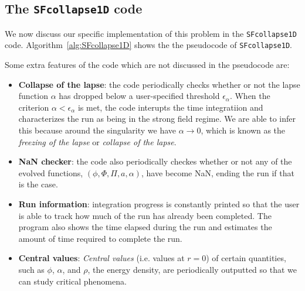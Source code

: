 \documentclass[a4paper,11pt]{article}
\renewcommand{\a}{\alpha}
\newcommand{\e}{\epsilon}
\newcommand{\lrpar}[1]{\left( #1 \right)}
\begin{document}
\subsection{The {\tt SFcollapse1D} code}

We now discuss our specific implementation of this problem in the {\tt SFcollapse1D} code. Algorithm~\ref{alg:SFcollapse1D} shows the the pseudocode of {\tt SFcollapse1D}.

Some extra features of the code which are not discussed in the pseudocode are:

\begin{itemize}
  \item \textbf{Collapse of the lapse}: the code periodically checks whether or not the lapse function $\a$ has dropped below a user-specified threshold $\e_{\a}$. When the criterion $\a<\e_{\a}$ is met, the code interupts the time integratiion and characterizes the run as being in the strong field regime. We are able to infer this because around the singularity we have $\a \to 0$, which is known as the \emph{freezing of the lapse} or \emph{collapse of the lapse}.

  \item \textbf{NaN checker}: the code also periodically checkes whether or not any of the evolved functions, $\lrpar{\phi,\Phi,\Pi,a,\a}$, have become NaN, ending the run if that is the case.

  \item \textbf{Run information}: integration progress is constantly printed so that the user is able to track how much of the run has already been completed. The program also shows the time elapsed during the run and estimates the amount of time required to complete the run.

  \item \textbf{Central values}: \emph{Central values} (i.e. values at $r=0$) of certain quantities, such as $\phi$, $\a$, and $\rho$, the energy density, are periodically outputted so that we can study critical phenomena.
\end{itemize}
\end{document}
